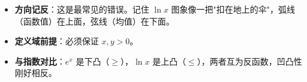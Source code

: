 \begin{trapbox}
\begin{itemize}
    \item \textbf{方向记反}：这是最常见的错误。记住 $\ln x$ 图象像一把"扣在地上的伞"，弧线（函数值）在上面，弦线（均值）在下面。
    \item \textbf{定义域前提}：必须保证 $x, y > 0$。
    \item \textbf{与指数对比}：$e^x$ 是下凸（$\geqslant$），$\ln x$ 是上凸（$\leqslant$），两者互为反函数，凹凸性刚好相反。
\end{itemize}
\end{trapbox}